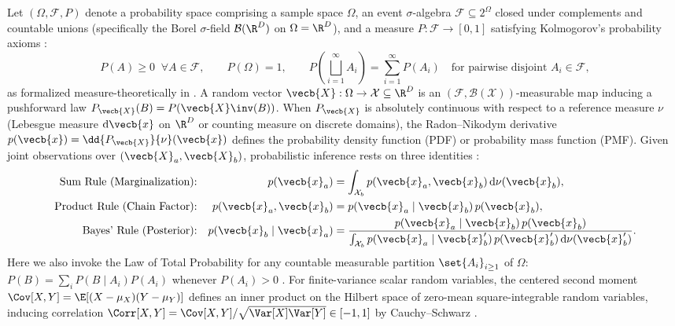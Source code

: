 \documentclass[../../../../master.tex]{subfiles}
\begin{document}
Let $(\Omega, \mathcal{F}, P)$ denote a probability space comprising a sample space $\Omega$, an event $\sigma$-algebra $\mathcal{F} \subseteq 2^{\Omega}$ closed under complements and countable unions (specifically the Borel $\sigma$-field $\mathcal{B}(\R^D)$ on $\Omega = \R^D$), and a measure $P : \mathcal{F} \to [0,1]$ satisfying Kolmogorov's probability axioms :
\begin{equation}\label{eq:probdist:axioms}
  P(A) \ge 0 \;\;\forall A \in \mathcal{F}, \qquad
  P(\Omega) = 1, \qquad
  P\!\left(\bigsqcup_{i=1}^{\infty} A_i\right) = \sum_{i=1}^{\infty} P(A_i) \quad \text{for pairwise disjoint } A_i \in \mathcal{F},
\end{equation}
as formalized measure-theoretically in . A random vector $\vecb{X} : \Omega \to \mathcal{X} \subseteq \R^D$ is an $(\mathcal{F}, \mathcal{B}(\mathcal{X}))$-measurable map inducing a pushforward law $P_{\vecb{X}}(B) = P(\vecb{X}\inv(B))$. When $P_{\vecb{X}}$ is absolutely continuous with respect to a reference measure $\nu$ (Lebesgue measure $\mathrm{d}\vecb{x}$ on $\R^D$ or counting measure on discrete domains), the Radon--Nikodym derivative $p(\vecb{x}) = \dd{P_{\vecb{X}}}{\nu}(\vecb{x})$ defines the probability density function (PDF) or probability mass function (PMF). Given joint observations over $(\vecb{X}_a, \vecb{X}_b)$, probabilistic inference rests on three identities  :
\begin{align}
  \text{Sum Rule (Marginalization):} && p(\vecb{x}_a) &= \int_{\mathcal{X}_b} p(\vecb{x}_a, \vecb{x}_b)\,\mathrm{d}\nu(\vecb{x}_b), \label{eq:probdist:sum_rule}\\
  \text{Product Rule (Chain Factor):} && p(\vecb{x}_a, \vecb{x}_b) &= p(\vecb{x}_a \mid \vecb{x}_b)\,p(\vecb{x}_b), \label{eq:probdist:prod_rule}\\
  \text{Bayes' Rule (Posterior):} && p(\vecb{x}_b \mid \vecb{x}_a) &= \frac{p(\vecb{x}_a \mid \vecb{x}_b)\,p(\vecb{x}_b)}{\int_{\mathcal{X}_b} p(\vecb{x}_a \mid \vecb{x}_b')\,p(\vecb{x}_b')\,\mathrm{d}\nu(\vecb{x}_b')}. \label{eq:probdist:bayes_rule}
\end{align}
Here we also invoke the Law of Total Probability for any countable measurable partition $\set{A_i}_{i\ge 1}$ of $\Omega$: $P(B) = \sum_{i} P(B \mid A_i) P(A_i)$ whenever $P(A_i) > 0$ . For finite-variance scalar random variables, the centered second moment $\Cov[X,Y] = \E[(X-\mu_X)(Y-\mu_Y)]$ defines an inner product on the Hilbert space of zero-mean square-integrable random variables, inducing correlation $\Corr[X,Y] = \Cov[X,Y]/\sqrt{\Var[X]\Var[Y]} \in [-1,1]$ by Cauchy--Schwarz  .
\end{document}
